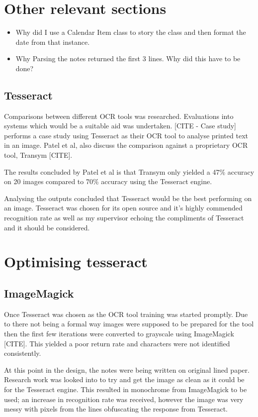 \section{Other relevant sections}
\begin{itemize}
  \item Why did I use a Calendar Item class to story the class and then format the date from that instance.
  \item Why Parsing the notes returned the first 3 lines. Why did this have to be done?

\end{itemize}

\subsection{Tesseract}
Comparisons between different OCR tools was researched. Evaluations into systems which would be a suitable aid was undertaken. [CITE - Case study] performs a case study using Tesseract as their OCR tool to analyse printed text in an image. Patel et al, also discuss the comparison against a proprietary OCR tool, Transym [CITE].

The results concluded by Patel et al is that Transym only yielded a 47\% accuracy on 20 images compared to 70\% accuracy using the Tesseract engine.

Analysing the outputs concluded that Tesseract would be the best performing on an image. Tesseract was chosen for its open source and it's highly commended recognition rate as well as my supervisor echoing the compliments of Tesseract and it should be considered.

\section{Optimising tesseract}

\subsection{ImageMagick}
Once Tesseract was chosen as the OCR tool training was started promptly. Due to there not being a formal way images were supposed to be prepared for the tool then the first few iterations were converted to grayscale using ImageMagick [CITE]. This yielded a poor return rate and characters were not identified consistently.

At this point in the design, the notes were being written on original lined paper. Research work was looked into to try and get the image as clean as it could be for the Tesseract engine. This resulted in monochrome from ImageMagick to be used; an increase in recognition rate was received, however the image was very messy with pixels from the lines obfuscating the response from Tesseract.

